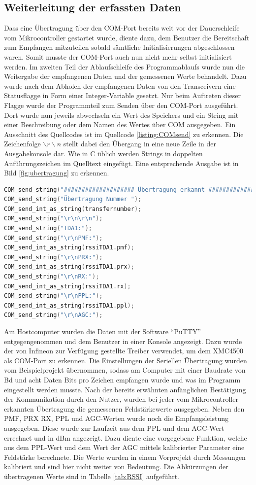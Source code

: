 \subsection{Weiterleitung der erfassten Daten}
Dass eine Übertragung über den COM-Port bereits weit vor der Dauerschleife vom Mikrocontroller gestartet wurde, diente dazu, dem Benutzer  die Bereitschaft zum Empfangen mitzuteilen sobald sämtliche Initialisierungen abgeschlossen waren. Somit musste der COM-Port auch nun nicht mehr selbst initialisiert werden.
Im zweiten Teil der Ablaufschleife des Programmablaufs wurde nun die Weitergabe der empfangenen Daten und der gemessenen Werte behandelt. Dazu wurde nach dem Abholen der empfangenen Daten von den Transceivern eine Statusflagge in Form einer Integer-Variable gesetzt. Nur beim Auftreten dieser Flagge wurde der Programmteil zum Senden über den COM-Port ausgeführt.
Dort wurde nun jeweils abwechseln ein Wert des Speichers und ein String mit einer Beschreibung oder dem Namen des Wertes über COM ausgegeben. Ein Ausschnitt des Quellcodes ist im Quellcode \ref{listing:COMsend} zu erkennen. Die Zeichenfolge $\backslash r\backslash n$ stellt dabei den Übergang in eine neue Zeile in der Ausgabekonsole dar. Wie in C üblich werden Strings in doppelten Anführungszeichen im Quelltext eingefügt. Eine entsprechende Ausgabe ist in Bild \ref{fig:ubertragung} zu erkennen. 
\begin{lstlisting}[caption={Ausschnitt aus dem Senden der Daten über den COM-Port},label={listing:COMsend},captionpos=b,language=C]
COM_send_string("#################### Übertragung erkannt ####################\r\n");
COM_send_string("Übertragung Nummer ");
COM_send_int_as_string(transfernumber);
COM_send_string("\r\n\r\n");
COM_send_string("TDA1:");
COM_send_string("\r\nPMF:");
COM_send_int_as_string(rssiTDA1.pmf);
COM_send_string("\r\nPRX:");
COM_send_int_as_string(rssiTDA1.prx);
COM_send_string("\r\nRX:");
COM_send_int_as_string(rssiTDA1.rx);
COM_send_string("\r\nPPL:");
COM_send_int_as_string(rssiTDA1.ppl);
COM_send_string("\r\nAGC:");
\end{lstlisting}
Am Hostcomputer wurden die Daten mit der Software \enquote{PuTTY} entgegengenommen und dem Benutzer in einer Konsole angezeigt. Dazu wurde der von Infineon zur Verfügung gestellte Treiber verwendet, um dem XMC4500 als COM-Port zu erkennen. %
Die Einstellungen der Seriellen Übertragung wurden vom Beispielprojekt übernommen, sodass am Computer mit einer Baudrate von \unit[115200]{Bd} und acht Daten Bits pro Zeichen empfangen wurde und was im Programm eingestellt werden musste. Nach der bereits erwähnten anfänglichen Bestätigung der Kommunikation durch den Nutzer, wurden bei jeder vom Mikrocontroller erkannten Übertragung die gemessenen Feldstärkewerte ausgegeben. Neben den PMF, PRX RX, PPL und AGC-Werten wurde noch die Empfangsleistung ausgegeben. Diese wurde zur Laufzeit aus dem PPL und dem AGC-Wert errechnet und in dBm angezeigt. Dazu diente eine vorgegebene Funktion, welche aus dem PPL-Wert und dem Wert der \ac{AGC} mittels kalibrierter Parameter eine Feldstärke berechnete. Die Werte wurden in einem Vorprojekt durch Messungen kalibriert und sind hier nicht weiter von Bedeutung. Die Abkürzungen der übertragenen Werte sind in Tabelle \ref{tab:RSSI} aufgeführt.

